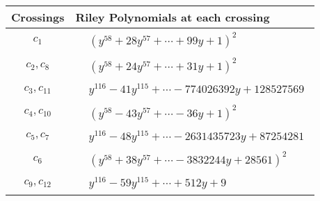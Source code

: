 \documentclass[1p]{elsarticle_modified}
\theoremstyle{definition}
\begin{document}
\begin{tabular}{m{50pt}|m{274pt}}
Crossings & \hspace{64pt}Riley Polynomials at each crossing \\
\hline $$\begin{aligned}c_{1}\end{aligned}$$&$\begin{aligned}
&(y^{58}+28 y^{57}+\cdots+99 y+1)^{2}
\end{aligned}$\\
\hline $$\begin{aligned}c_{2},c_{8}\end{aligned}$$&$\begin{aligned}
&(y^{58}+24 y^{57}+\cdots+31 y+1)^{2}
\end{aligned}$\\
\hline $$\begin{aligned}c_{3},c_{11}\end{aligned}$$&$\begin{aligned}
&y^{116}-41 y^{115}+\cdots-774026392 y+128527569
\end{aligned}$\\
\hline $$\begin{aligned}c_{4},c_{10}\end{aligned}$$&$\begin{aligned}
&(y^{58}-43 y^{57}+\cdots-36 y+1)^{2}
\end{aligned}$\\
\hline $$\begin{aligned}c_{5},c_{7}\end{aligned}$$&$\begin{aligned}
&y^{116}-48 y^{115}+\cdots-2631435723 y+87254281
\end{aligned}$\\
\hline $$\begin{aligned}c_{6}\end{aligned}$$&$\begin{aligned}
&(y^{58}+38 y^{57}+\cdots-3832244 y+28561)^{2}
\end{aligned}$\\
\hline $$\begin{aligned}c_{9},c_{12}\end{aligned}$$&$\begin{aligned}
&y^{116}-59 y^{115}+\cdots+512 y+9
\end{aligned}$\\
\hline
\end{tabular}\\~\\
\end{document}
